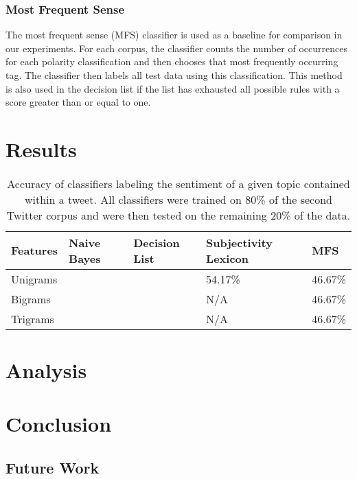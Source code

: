 \documentclass[11pt]{article}
\begin{document}
\subsubsection*{Most Frequent Sense}
The most frequent sense (MFS) classifier is used as a baseline for comparison in our experiments. For each corpus, the classifier counts the number of occurrences for each polarity classification and then chooses that most frequently occurring tag. The classifier then labels all test data using this classification. This method is also used in the decision list if the list has exhausted all possible rules with a score greater than or equal to one.

\section{Results}
\begin{table*}[ht]
  \begin{center}
  \begin{tabular}{| l || l | l | l | l |}
  \hline
  Features & Naive Bayes & Decision List & Subjectivity Lexicon & MFS \\ 
  \hline \hline
  Unigrams &  &  & 54.17\% & 46.67\% \\  \hline
  Bigrams &  &  & N/A & 46.67\% \\   \hline
  Trigrams &  &  & N/A & 46.67\% \\  \hline
  \end{tabular}
  \end{center}
  \caption{Accuracy of classifiers labeling the sentiment of a given topic contained within a tweet. All classifiers were trained on 80\% of the second Twitter corpus and were then tested on the remaining 20\% of the data.}
\end{table*}

\section{Analysis}

\section{Conclusion}
\subsection{Future Work}



\end{document}
